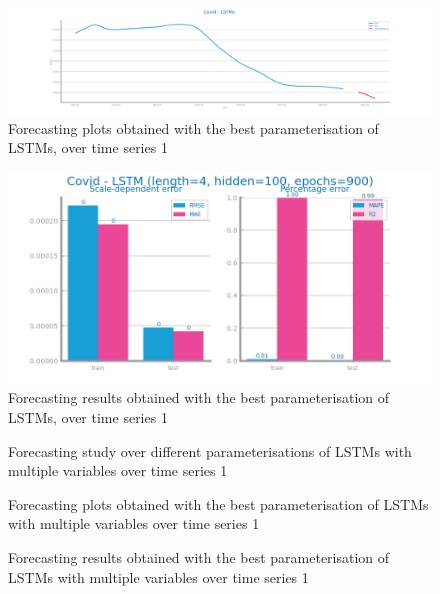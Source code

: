 \documentclass[10pt]{extarticle}
\begin{document}
\begin{figure}[H]
\centering\includegraphics[scale=0.5]{images/dataset1/time_series/Covid - LSTMs _forecasting_series.png}
\caption{Forecasting plots obtained with the best parameterisation of LSTMs, over time series 1}
\end{figure}

\begin{figure}[H]
\centering\includegraphics[scale=0.5]{images/dataset1/time_series/Covid - LSTM (length=4, hidden=100, epochs=900)_forecasting_eval.png}
\caption{Forecasting results obtained with the best parameterisation of LSTMs, over time series 1}
\end{figure}

\begin{figure}[H]
\caption{Forecasting study over different parameterisations of LSTMs with multiple variables over time series 1}
\end{figure}

\begin{figure}[H]
\caption{Forecasting plots obtained with the best parameterisation of LSTMs with multiple variables over time series 1}
\end{figure}

\begin{figure}[H]
\caption{Forecasting results obtained with the best parameterisation of LSTMs with multiple variables over time series 1}
\end{figure}
\end{document}
